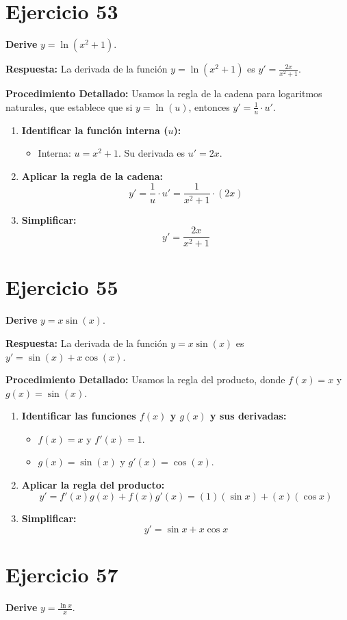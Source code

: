 \documentclass[12pt, a4paper]{article}
\begin{document}
\section{Ejercicio 53}
\textbf{Derive} $y=\ln(x^2+1)$.

\textbf{Respuesta:}
La derivada de la función $y=\ln(x^2+1)$ es $y'=\frac{2x}{x^2+1}$.

\textbf{Procedimiento Detallado:}
Usamos la regla de la cadena para logaritmos naturales, que establece que si $y=\ln(u)$, entonces $y'=\frac{1}{u}\cdot u'$.
\begin{enumerate}
    \item \textbf{Identificar la función interna ($u$):}
    \begin{itemize}
        \item Interna: $u=x^2+1$. Su derivada es $u'=2x$.
    \end{itemize}
    \item \textbf{Aplicar la regla de la cadena:}
    \[y'=\frac{1}{u}\cdot u'=\frac{1}{x^2+1}\cdot(2x)\]
    \item \textbf{Simplificar:}
    \[y'=\frac{2x}{x^2+1}\]
\end{enumerate}

\section{Ejercicio 55}
\textbf{Derive} $y=x\sin(x)$.

\textbf{Respuesta:}
La derivada de la función $y=x\sin(x)$ es $y'=\sin(x)+x\cos(x)$.

\textbf{Procedimiento Detallado:}
Usamos la regla del producto, donde $f(x)=x$ y $g(x)=\sin(x)$.
\begin{enumerate}
    \item \textbf{Identificar las funciones $f(x)$ y $g(x)$ y sus derivadas:}
    \begin{itemize}
        \item $f(x)=x$ y $f'(x)=1$.
        \item $g(x)=\sin(x)$ y $g'(x)=\cos(x)$.
    \end{itemize}
    \item \textbf{Aplicar la regla del producto:}
    \[y'=f'(x)g(x)+f(x)g'(x) = (1)(\sin x)+(x)(\cos x)\]
    \item \textbf{Simplificar:}
    \[y'=\sin x+x\cos x\]
\end{enumerate}

\section{Ejercicio 57}
\textbf{Derive} $y=\frac{\ln x}{x}$.
\end{document}

